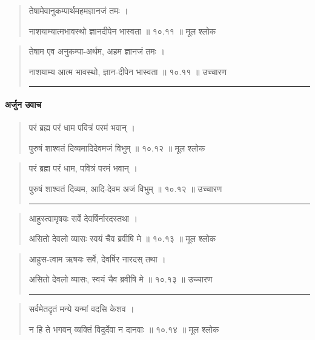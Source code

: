 \begin{quotation} 

तेषामेवानुकम्पार्थमहमज्ञानजं तमः ।  

नाशयाम्यात्मभावस्थो ज्ञानदीपेन भास्वता  ॥ १०.११ ॥  मूल श्लोक
\end{quotation}

\begin{quotation}

तेषाम एव अनुकम्पा-अर्थम, अहम ज्ञानजं तमः ।  

नाशयाम्य आत्म भावस्थो, ज्ञान-दीपेन भास्वता  ॥ १०.११ ॥  उच्चारण

\noindent\rule{16cm}{0.4pt} 
\end{quotation}

\paragraph{\sanskrit अर्जुन उवाच}

\begin{quotation} 

परं ब्रह्म परं धाम पवित्रं परमं भवान्‌  ।  

पुरुषं शाश्वतं दिव्यमादिदेवमजं विभुम्‌  ॥ १०.१२ ॥  मूल श्लोक
\end{quotation}

\begin{quotation}

परं ब्रह्म परं धाम, पवित्रं परमं भवान्‌  ।  

पुरुषं शाश्वतं दिव्यम, आदि-देवम अजं विभुम्‌  ॥ १०.१२ ॥  उच्चारण

\noindent\rule{16cm}{0.4pt} 
\end{quotation}


\begin{quotation} 

आहुस्त्वामृषयः सर्वे देवर्षिर्नारदस्तथा  ।  

असितो देवलो व्यासः स्वयं चैव ब्रवीषि मे  ॥ १०.१३ ॥  मूल श्लोक
\end{quotation}

\begin{quotation}

आहुस-त्वाम ऋषयः सर्वे, देवर्षिर नारदस् तथा  ।  

असितो देवलो व्यासः, स्वयं चैव ब्रवीषि मे  ॥ १०.१३ ॥  उच्चारण

\noindent\rule{16cm}{0.4pt} 
\end{quotation}


\begin{quotation} 

सर्वमेतदृतं मन्ये यन्मां वदसि केशव ।  

न हि ते भगवन् व्यक्तिं विदुर्देवा न दानवाः ॥ १०.१४ ॥  मूल श्लोक
\end{quotation}

